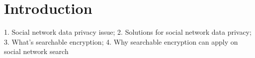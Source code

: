 \chapter{Introduction}

1. Social network data privacy issue;
2. Solutions for social network data privacy;
3. What's searchable encryption;
4. Why searchable encryption can apply on social network search